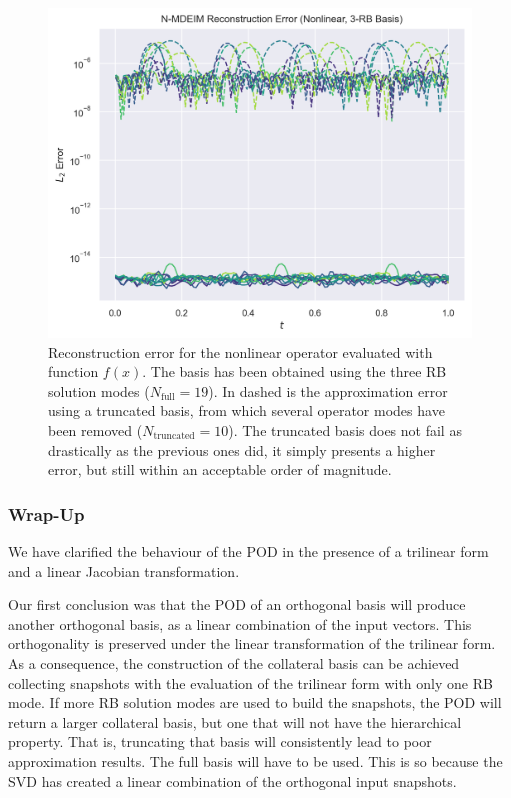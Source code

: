 \documentclass[../../thesis.tex]{subfiles}
\begin{document}
\begin{figure}[h]
    \includegraphics[width=\columnwidth]{research_project/piston/figures/svd_fourier/trilinear_nonlinear/rb_basis_mdeim_errors_nonlinear_num_3.png}
    \caption{Reconstruction error for the nonlinear operator evaluated with function $f(x)$.
    The basis has been obtained using the three RB solution modes ($N_{\text{full}}=19$).
    In dashed is the approximation error using a truncated basis, 
    from which several operator modes have been removed ($N_{\text{truncated}}=10$). 
    The truncated basis does not fail as drastically as the previous ones did, it simply presents a higher error,
    but still within an acceptable order of magnitude.}
    \label{fig:appendix_rb_nonlinear_num_3}
\end{figure}

\subsubsection{Wrap-Up}
We have clarified the behaviour of the POD in the presence of a trilinear form 
and a linear Jacobian transformation.

Our first conclusion was that the POD of an orthogonal basis will produce
another orthogonal basis, as a linear combination of the input vectors.
This orthogonality is preserved under the linear transformation of the trilinear form.
As a consequence, the construction of the collateral basis can be achieved 
collecting snapshots with the evaluation of the trilinear form with 
only one RB mode.
If more RB solution modes are used to build the snapshots, 
the POD will return a larger collateral basis,
but one that will not have the hierarchical property.
That is, truncating that basis will consistently lead to poor approximation results.
The full basis will have to be used.
This is so because the SVD has created a linear combination of the orthogonal input snapshots.
\end{document}
